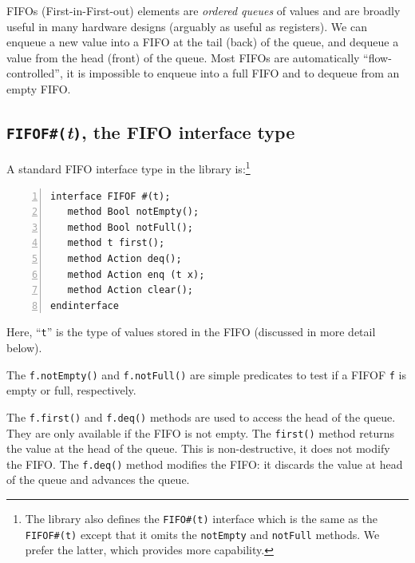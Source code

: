 FIFOs (First-in-First-out) elements are \emph{ordered queues} of
values and are broadly useful in many hardware designs (arguably as
useful as registers).  We can enqueue a new value into a FIFO at the
tail (back) of the queue, and dequeue a value from the head (front) of
the queue.  Most {\BSV} FIFOs are automatically ``flow-controlled'',
{\ie} it is impossible to enqueue into a full FIFO and to dequeue from
an empty FIFO.


\subsection{{\tt FIFOF\#(}\emph{t}{\tt )}, the FIFO interface type}

\label{Sec_FIFOF_interface}


A standard FIFO interface type in the {\BSV} library is:\footnote{The
{\BSV} library also defines the {\tt FIFO\#(t)} interface which is the
same as the {\tt FIFOF\#(t)} except that it omits the {\tt notEmpty}
and {\tt notFull} methods.  We prefer the latter, which provides more
capability.}

{\footnotesize
\begin{Verbatim}[frame=single, numbers=left]
interface FIFOF #(t);
   method Bool notEmpty();
   method Bool notFull();
   method t first();
   method Action deq();
   method Action enq (t x);
   method Action clear();
endinterface
\end{Verbatim}
}

Here, ``\verb|t|'' is the type of values stored in the FIFO (discussed
in more detail below).

The \verb|f.notEmpty()| and \verb|f.notFull()| are simple predicates
to test if a FIFOF {\tt f} is empty or full, respectively.

The \verb|f.first()| and \verb|f.deq()| methods are used to access the
head of the queue.  They are only available if the FIFO is not empty.
The \verb|first()| method returns the value at the head of the queue.
This is non-destructive, {\ie} it does not modify the FIFO.  The
\verb|f.deq()| method modifies the FIFO: it discards the value at head
of the queue and advances the queue.

